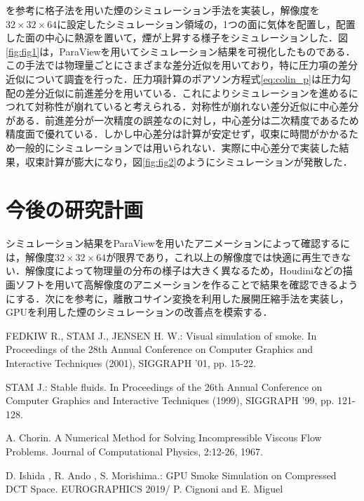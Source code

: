 \documentclass[10pt,a4paper,notitlepage,oneside,twocolumn]{abst_jsarticle}
\begin{document}



\cite{fedkiew}を参考に格子法を用いた煙のシミュレーション手法を実装し，解像度を$32\times32\times64$に設定したシミュレーション領域の，1つの面に気体を配置し，配置した面の中心に熱源を置いて，煙が上昇する様子をシミュレーションした．図\ref{fig:fig1}は，ParaViewを用いてシミュレーション結果を可視化したものである．この手法では物理量ごとにさまざまな差分近似を用いており，特に圧力項の差分近似について調査を行った．圧力項計算のポアソン方程式\ref{eq:colin_p}は圧力勾配の差分近似に前進差分を用いている．これによりシミュレーションを進めるにつれて対称性が崩れていると考えられる．対称性が崩れない差分近似に中心差分がある．前進差分が一次精度の誤差なのに対し，中心差分は二次精度であるため精度面で優れている．しかし中心差分は計算が安定せず，収束に時間がかかるため一般的にシミュレーションでは用いられない．実際に中心差分で実装した結果，収束計算が膨大になり，図\ref{fig:fig2}のようにシミュレーションが発散した．

\section{今後の研究計画}
シミュレーション結果をParaViewを用いたアニメーションによって確認するには，解像度$32\times32\times64$が限界であり，これ以上の解像度では快適に再生できない．解像度によって物理量の分布の様子は大きく異なるため，Houdiniなどの描画ソフトを用いて高解像度のアニメーションを作ることで結果を確認できるようにする．次に\cite{GPU}を参考に，離散コサイン変換を利用した展開圧縮手法を実装し，GPUを利用した煙のシミュレーションの改善点を模索する．
\begin{thebibliography}{99}

FEDKIW R., STAM J., JENSEN H. W.: Visual simulation of smoke. In Proceedings of the 28th Annual Conference on Computer Graphics and Interactive Techniques (2001), SIGGRAPH ’01, pp. 15-22. 

STAM J.: Stable fluids. In Proceedings of the 26th Annual Conference on Computer Graphics and Interactive Techniques (1999), SIGGRAPH ’99, pp. 121-128. 

A. Chorin. A Numerical Method for Solving Incompressible Viscous Flow Problems. Journal of Computational Physics, 2:12-26, 1967.

D. Ishida , R. Ando , S. Morishima.: GPU Smoke Simulation on Compressed DCT Space. EUROGRAPHICS 2019/ P. Cignoni and E. Miguel

\end{thebibliography}
\end{document}
